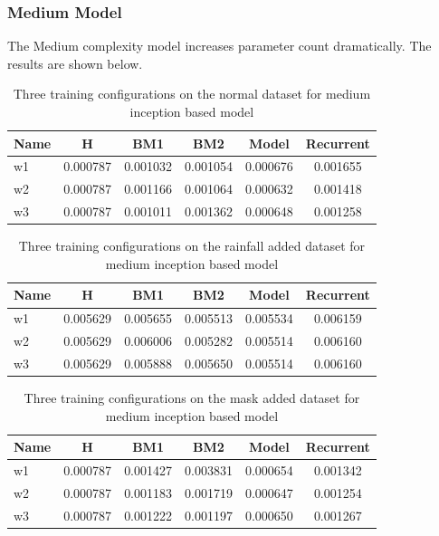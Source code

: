 \subsubsection*{Medium Model}
The Medium complexity model increases parameter count dramatically. The results are shown below.
\begin{table}[htbp]
	\centering
	\caption{Three training configurations on the normal dataset for medium inception based model}
	\label{tab:medium_normal}
	\begin{tabular}{p{2cm}ccccc}
		\toprule
		Name &  H &  BM1 &  BM2 &  Model &  Recurrent \\
		\midrule
		w1 &       0.000787 &        0.001032 &        0.001054 &   0.000676 &            0.001655 \\
		w2 &       0.000787 &        0.001166 &        0.001064 &   0.000632 &            0.001418 \\
		w3 &       0.000787 &        0.001011 &        0.001362 &   0.000648 &            0.001258 \\
		\bottomrule
	\end{tabular}
\end{table}

\begin{table}[htbp]
	\centering
	\caption{Three training configurations on the rainfall added dataset for medium inception based model}
	\label{tab:medium_rf}
	\begin{tabular}{p{2cm}ccccc}
		\toprule
		Name &  H &  BM1 &  BM2 &  Model &  Recurrent \\
		\midrule
		w1 &       0.005629 &        0.005655 &        0.005513 &   0.005534 &            0.006159 \\
		w2 &       0.005629 &        0.006006 &        0.005282 &   0.005514 &            0.006160 \\
		w3 &       0.005629 &        0.005888 &        0.005650 &   0.005514 &            0.006160 \\
		\bottomrule
	\end{tabular}
\end{table}

\begin{table}[htbp]
	\centering
	\caption{Three training configurations on the mask added dataset for medium inception based model}
	\label{tab:medium_mask}
	\begin{tabular}{p{2cm}ccccc}
		\toprule
		Name &  H &  BM1 &  BM2 &  Model &  Recurrent \\
		\midrule
		w1 &       0.000787 &        0.001427 &        0.003831 &   0.000654 &            0.001342 \\
		w2 &       0.000787 &        0.001183 &        0.001719 &   0.000647 &            0.001254 \\
		w3 &       0.000787 &        0.001222 &        0.001197 &   0.000650 &            0.001267 \\
		\bottomrule
	\end{tabular}
\end{table}

